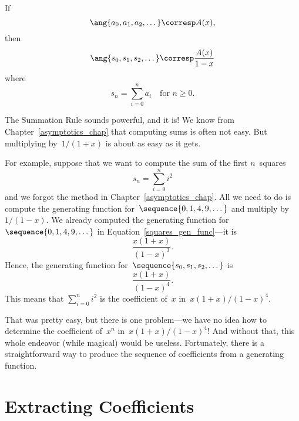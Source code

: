 \begin{rul}
If
\begin{equation*}
    \ang{a_0, a_1, a_2, \dots} \corresp A(x),
\end{equation*}
then
\begin{equation*}
    \ang{s_0, s_1, s_2, \dots} \corresp \frac{A(x)}{1 - x}
\end{equation*}
where
\begin{equation*}
    s_n = \sum_{i = 0}^n a_i\quad\text{for $n \ge 0$}.
\end{equation*}
\end{rul}

  The Summation
Rule sounds powerful, and it is!  We know from
Chapter~\ref{asymptotics_chap} that computing sums is often not easy.
But multiplying  by~$1/(1 + x)$ is about as
easy as it gets.

For example, suppose that we want to compute the sum of the first
$n$~squares
\begin{equation*}
    s_n = \sum_{i = 0}^n i^2
\end{equation*}
and we forgot the method in Chapter~\ref{asymptotics_chap}.  All we
need to do is compute the generating function for~$\sequence{0, 1, 4,
  9, \dots}$ and multiply by~$1/(1 - x)$.  We already computed the
generating function for ~$\sequence{0, 1, 4, 9, \dots}$ in
Equation~\ref{squares_gen_func}---it is
\begin{equation*}
    \frac{x (1 + x)}{(1 - x)^3}.
\end{equation*}
Hence, the generating function for~$\sequence{s_0, s_1, s_2, \dots}$
is
\begin{equation*}
    \frac{x (1 + x)}{(1 - x)^4}.
\end{equation*}
This means that $\sum_{i = 0}^n i^2$ is the coefficient of~$x$ in~$x
(1 + x)/(1 - x)^4$.

That was pretty easy, but there is one problem---we have no idea how
to determine the coefficient of~$x^n$ in~$x(1 + x)/(1 - x)^4$!  And
without that, this whole endeavor (while magical) would be useless.
Fortunately, there is a straightforward way to produce the sequence of
coefficients from a generating function.

\section{Extracting Coefficients}

